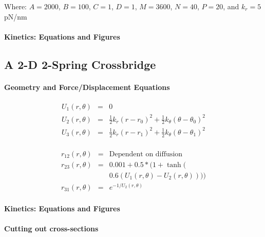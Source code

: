\documentclass[]{article}
\begin{document}
Where: $A = 2000$, $B = 100$, $C = 1$, $D = 1$, $M = 3600$, $N = 40$, $P = 20$, and $k_r = 5$ pN/nm
 
\paragraph*{Kinetics: Equations and Figures}




\subsection*{A 2-D 2-Spring Crossbridge}


\paragraph*{Geometry and Force/Displacement Equations}


\begin{eqnarray}
\label{2sEnergy}
	U_1(r,\theta) & = & 0 \nonumber \\
    U_2(r,\theta) & = & \frac{1}{2}k_r (r - r_0)^2 + 
                        \frac{1}{2}k_\theta (\theta - \theta_0)^2 \nonumber \\
    U_3(r,\theta) & = & \frac{1}{2}k_r (r - r_1)^2 + 
                        \frac{1}{2}k_\theta (\theta - \theta_1)^2 \\
\end{eqnarray}

\begin{eqnarray}  
\label{2sTransRates}
	r_{12}(r, \theta)   & = & \text{Dependent on diffusion} \nonumber \\
    r_{23}(r, \theta)   & = & 0.001 + 0.5 * (1 + \tanh( \nonumber \\
                        &   & 0.6 (U_1(r, \theta) - U_2(r, \theta)))) \\
	r_{31}(r, \theta)   & = & e^{-1 / U_2(r, \theta)}
\end{eqnarray} 

\paragraph*{Kinetics: Equations and Figures}


\paragraph*{Cutting out cross-sections}
\end{document}
